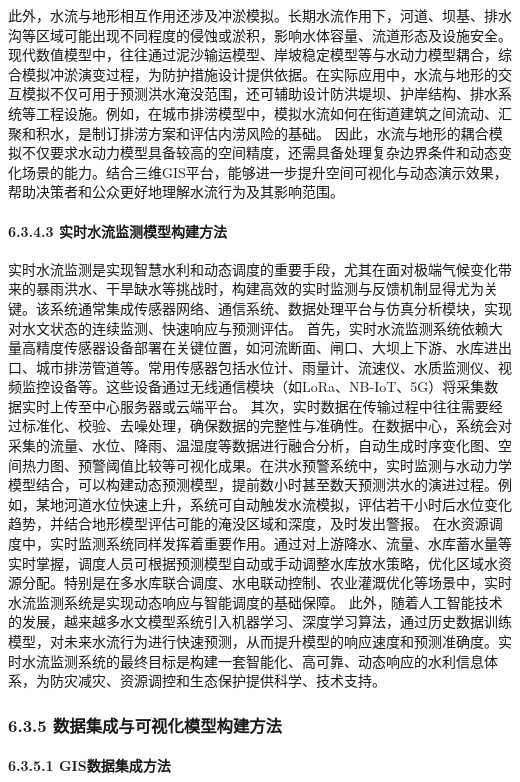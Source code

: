 此外，水流与地形相互作用还涉及冲淤模拟。长期水流作用下，河道、坝基、排水沟等区域可能出现不同程度的侵蚀或淤积，影响水体容量、流道形态及设施安全。现代数值模型中，往往通过泥沙输运模型、岸坡稳定模型等与水动力模型耦合，综合模拟冲淤演变过程，为防护措施设计提供依据。在实际应用中，水流与地形的交互模拟不仅可用于预测洪水淹没范围，还可辅助设计防洪堤坝、护岸结构、排水系统等工程设施。例如，在城市排涝模型中，模拟水流如何在街道建筑之间流动、汇聚和积水，是制订排涝方案和评估内涝风险的基础。 因此，水流与地形的耦合模拟不仅要求水动力模型具备较高的空间精度，还需具备处理复杂边界条件和动态变化场景的能力。结合三维GIS平台，能够进一步提升空间可视化与动态演示效果，帮助决策者和公众更好地理解水流行为及其影响范围。 \paragraph{6.3.4.3 实时水流监测模型构建方法}\label{ux5b9eux65f6ux6c34ux6d41ux76d1ux6d4bux6a21ux578bux6784ux5efaux65b9ux6cd5} 实时水流监测是实现智慧水利和动态调度的重要手段，尤其在面对极端气候变化带来的暴雨洪水、干旱缺水等挑战时，构建高效的实时监测与反馈机制显得尤为关键。该系统通常集成传感器网络、通信系统、数据处理平台与仿真分析模块，实现对水文状态的连续监测、快速响应与预测评估。 首先，实时水流监测系统依赖大量高精度传感器设备部署在关键位置，如河流断面、闸口、大坝上下游、水库进出口、城市排涝管道等。常用传感器包括水位计、雨量计、流速仪、水质监测仪、视频监控设备等。这些设备通过无线通信模块（如LoRa、NB-IoT、5G）将采集数据实时上传至中心服务器或云端平台。 其次，实时数据在传输过程中往往需要经过标准化、校验、去噪处理，确保数据的完整性与准确性。在数据中心，系统会对采集的流量、水位、降雨、温湿度等数据进行融合分析，自动生成时序变化图、空间热力图、预警阈值比较等可视化成果。在洪水预警系统中，实时监测与水动力学模型结合，可以构建动态预测模型，提前数小时甚至数天预测洪水的演进过程。例如，某地河道水位快速上升，系统可自动触发水流模拟，评估若干小时后水位变化趋势，并结合地形模型评估可能的淹没区域和深度，及时发出警报。 在水资源调度中，实时监测系统同样发挥着重要作用。通过对上游降水、流量、水库蓄水量等实时掌握，调度人员可根据预测模型自动或手动调整水库放水策略，优化区域水资源分配。特别是在多水库联合调度、水电联动控制、农业灌溉优化等场景中，实时水流监测系统是实现动态响应与智能调度的基础保障。 此外，随着人工智能技术的发展，越来越多水文模型系统引入机器学习、深度学习算法，通过历史数据训练模型，对未来水流行为进行快速预测，从而提升模型的响应速度和预测准确度。实时水流监测系统的最终目标是构建一套智能化、高可靠、动态响应的水利信息体系，为防灾减灾、资源调控和生态保护提供科学、技术支持。 \subsubsection{6.3.5 数据集成与可视化模型构建方法}\label{ux6570ux636eux96c6ux6210ux4e0eux53efux89c6ux5316ux6a21ux578bux6784ux5efaux65b9ux6cd5} \paragraph{6.3.5.1 GIS数据集成方法}\label{gisux6570ux636eux96c6ux6210ux65b9ux6cd5} 